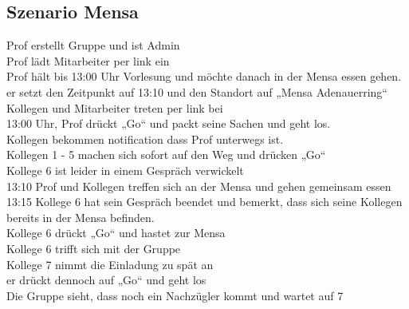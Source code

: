 \subsection{Szenario Mensa}
Prof erstellt Gruppe und ist Admin\\
Prof lädt Mitarbeiter per link ein\\
Prof hält bis 13:00 Uhr Vorlesung und möchte danach in der Mensa essen gehen.\\
er setzt den Zeitpunkt auf 13:10 und den Standort auf „Mensa Adenauerring“\\
Kollegen und Mitarbeiter treten per link bei\\
13:00 Uhr, Prof drückt „Go“ und packt seine Sachen und geht los.\\
Kollegen bekommen notification dass Prof unterwegs ist.\\
Kollegen 1 - 5 machen sich sofort auf den Weg und drücken „Go“\\
Kollege 6 ist leider in einem Gespräch verwickelt\\
13:10 Prof und Kollegen treffen sich an der Mensa und gehen gemeinsam essen\\
13:15 Kollege 6 hat sein Gespräch beendet und bemerkt, dass sich seine Kollegen bereits in der Mensa befinden.\\
Kollege 6 drückt „Go“ und hastet zur Mensa\\
Kollege 6 trifft sich mit der Gruppe\\
Kollege 7 nimmt die Einladung zu spät an\\ 
er drückt dennoch auf „Go“ und geht los\\
Die Gruppe sieht, dass noch ein Nachzügler kommt und wartet auf 7\\
